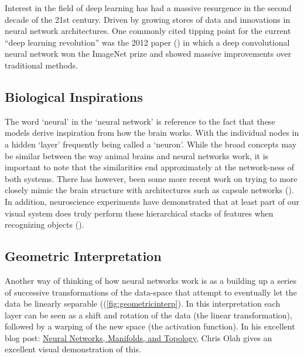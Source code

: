 \documentclass[]{book}
\theoremstyle{definition}
\theoremstyle{definition}
\theoremstyle{definition}
\theoremstyle{remark}
\begin{document}
Interest in the field of deep learning has had a massive resurgence in
the second decade of the 21st century. Driven by growing stores of data
and innovations in neural network architectures. One commonly cited
tipping point for the current ``deep learning revolution'' was the 2012
paper (\citet{imagenet_2012}) in which a deep convolutional neural
network won the ImageNet prize and showed massive improvements over
traditional methods.

\subsection{Biological Inspirations}\label{biological-inspirations}

The word `neural' in the `neural network' is reference to the fact that
these models derive inspiration from how the brain works. With the
individual nodes in a hidden `layer' frequently being called a `neuron'.
While the broad concepts may be similar between the way animal brains
and neural networks work, it is important to note that the similarities
end approximately at the network-ness of both systems. There has
however, been some more recent work on trying to more closely mimic the
brain structure with architectures such as capsule networks
(\citet{capsnet}). In addition, neuroscience experiments have
demonstrated that at least part of our visual system does truly perform
these hierarchical stacks of features when recognizing objects
(\citet{cnn_animals}).

\subsection{Geometric Interpretation}\label{geometric-interpretation}

Another way of thinking of how neural networks work is as a building up
a series of successive transformations of the data-space that attempt to
eventually let the data be linearly separable
((\ref{fig:geometricinterp}). In this interpretation each layer can be
seen as a shift and rotation of the data (the linear transformation),
followed by a warping of the new space (the activation function). In his
excellent blog post:
\href{http://colah.github.io/posts/2014-03-NN-Manifolds-Topology/}{Neural
Networks, Manifolds, and Topology}, Chris Olah gives an excellent visual
demonstration of this.
\end{document}
